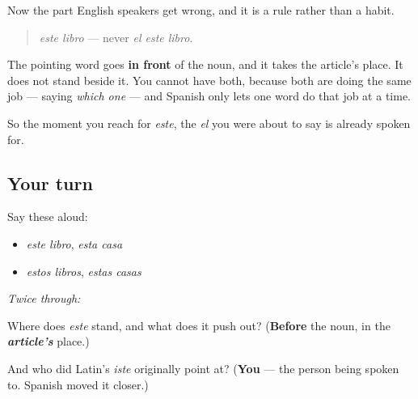 \begin{culture}
Now the part English speakers get wrong, and it is a rule rather than a habit.

\begin{quote}
\emph{este libro} — never \emph{el este libro}.
\end{quote}

The pointing word goes \textbf{in front} of the noun, and it takes the article's place. It does not stand beside it. You cannot have both, because both are doing the same job — saying \emph{which one} — and Spanish only lets one word do that job at a time.

So the moment you reach for \emph{este}, the \emph{el} you were about to say is already spoken for.
\end{culture}

\subsection*{Your turn}
Say these aloud:

\begin{itemize}
\raggedright
  \item \emph{este libro}, \emph{esta casa}
  \item \emph{estos libros}, \emph{estas casas}
\end{itemize}

\emph{Twice through:}

\begin{tcolorbox}[breakable,colback=teal!4,colframe=teal!35!black,title={Before you move on}]
Where does \emph{este} stand, and what does it push out? (\textbf{Before} the noun, in the \emph{\textbf{article's}} place.)

And who did Latin's \emph{iste} originally point at? (\textbf{You} — the person being spoken to. Spanish moved it closer.)
\end{tcolorbox}
